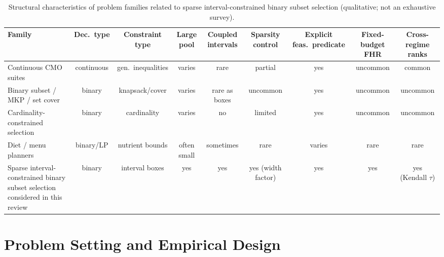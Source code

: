 \documentclass[lettersize,journal]{IEEEtran}
\begin{document}
\begin{table}[!t]
\centering
\caption{Structural characteristics of problem families related to sparse interval-constrained binary subset selection (qualitative; not an exhaustive survey).}
\label{tab:position}
\setlength{\tabcolsep}{3pt}
\begin{tabular}{@{}lcccccccc@{}}
\toprule
Family & Dec.\ type & Constraint type & Large pool & Coupled intervals & Sparsity control & Explicit feas.\ predicate & Fixed-budget FHR & Cross-regime ranks \\
\midrule
Continuous CMO suites~\cite{deb2002,zhang2007,qiao2024evolutionaryconsfb48} & continuous & gen.\ inequalities & varies & rare & partial & yes & uncommon & common \\
Binary subset / MKP / set cover~\cite{bai2026arandomforestgui6cda,liefooghe2023adaptivelandscapdb6a} & binary & knapsack/cover & varies & rare as boxes & uncommon & yes & uncommon & uncommon \\
Cardinality-constrained selection~\cite{gu2024subsetselectionf5654} & binary & cardinality & varies & no & limited & yes & uncommon & uncommon \\
Diet / menu planners~\cite{stigler1945,gaal2005,zhao2025acmodiet,segura2019anovelmemeticalgb128} & binary/LP & nutrient bounds & often small & sometimes & rare & varies & rare & rare \\
Sparse interval-constrained binary subset selection considered in this review & binary & interval boxes & yes & yes & yes (width factor) & yes & yes & yes (Kendall $\tau$) \\
\bottomrule
\end{tabular}
\end{table}

\section{Problem Setting and Empirical Design}
\label{sec:formulation}
\end{document}
